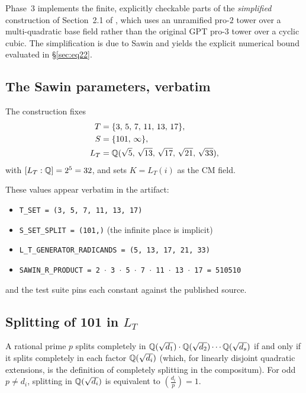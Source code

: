
Phase~3 implements the finite, explicitly checkable parts of the
\emph{simplified} construction of Section~2.1 of
\cite{Sawin2026Remarks}, which uses an unramified pro-$2$ tower over a
multi-quadratic base field rather than the original GPT pro-$3$ tower
over a cyclic cubic. The simplification is due to Sawin and yields the
explicit numerical bound evaluated in \S\ref{sec:eq22}.

\subsection{The Sawin parameters, verbatim}

The construction fixes
\begin{align*}
  T   &= \{3,\, 5,\, 7,\, 11,\, 13,\, 17\}, \\
  S   &= \{101,\, \infty\}, \\
  L_T &= \mathbb{Q}(\sqrt{5},\, \sqrt{13},\, \sqrt{17},\, \sqrt{21},\, \sqrt{33}),
\end{align*}
with $[L_T : \mathbb{Q}] = 2^5 = 32$, and sets $K = L_T(i)$ as the CM field.

These values appear verbatim in the artifact:
\begin{itemize}[leftmargin=*]
  \item \texttt{T\_SET = (3, 5, 7, 11, 13, 17)}
  \item \texttt{S\_SET\_SPLIT = (101,)} (the infinite place is implicit)
  \item \texttt{L\_T\_GENERATOR\_RADICANDS = (5, 13, 17, 21, 33)}
  \item \texttt{SAWIN\_R\_PRODUCT = 2 \(\cdot\) 3 \(\cdot\) 5 \(\cdot\) 7 \(\cdot\) 11 \(\cdot\) 13 \(\cdot\) 17 = 510510}
\end{itemize}
and the test suite pins each constant against the published source.

\subsection{Splitting of 101 in $L_T$}

A rational prime $p$ splits completely in
$\mathbb{Q}(\sqrt{d_1}) \cdot \mathbb{Q}(\sqrt{d_2}) \cdots \mathbb{Q}(\sqrt{d_s})$ if and only
if it splits completely in each factor $\mathbb{Q}(\sqrt{d_i})$ (which, for
linearly disjoint quadratic extensions, is the definition of
completely splitting in the compositum). For odd
$p \neq d_i$, splitting in $\mathbb{Q}(\sqrt{d_i})$ is equivalent to
$\left(\frac{d_i}{p}\right) = 1$.

